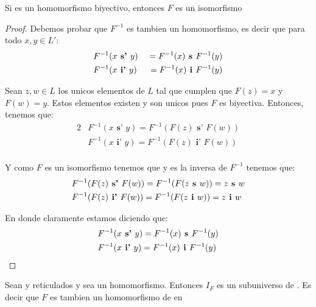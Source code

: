 \begin{lemma}
  Si  es un homomorfismo biyectivo,
  entonces $F$ es un isomorfismo
\end{lemma}
\begin{proof}
  Debemos probar que $F^{-1}$ es tambien un homomorfismo, es decir que para todo $x, y \in L'$:
  \begin{alignat*}{2}
    &F^{-1}(x \textbf{ s' }y) &\ = F^{-1}(x)\textbf{ s }F^{-1}(y)\\
    &F^{-1}(x \textbf{ i' }y) &\ = F^{-1}(x)\textbf{ i }F^{-1}(y)\\    
  \end{alignat*}

  Sean $z, w \in L$ los unicos elementos de $L$ tal que cumplen que $F(z) = x$ y $F(w) = y$. Estos elementos
  existen y son unicos pues $F$ es biyectiva. Entonces, tenemos que:
  \begin{alignat*}{2}
    &F^{-1}(x \textbf{ s' }y) = F^{-1}(F(z) \textbf{ s' }F(w))\\
    &F^{-1}(x \textbf{ i' }y) = F^{-1}(F(z) \textbf{ i' }F(w))\\    
  \end{alignat*}

  Y como $F$ es un isomorfismo tenemos que y es la inversa de $F^{-1}$ tenemos que:
  \begin{alignat*}{2}
    &F^{-1}(F(z) \textbf{ s' }F(w)) = F^{-1}(F(z\textbf{ s }w)) = z\textbf{ s }w\\
    &F^{-1}(F(z) \textbf{ i' }F(w)) = F^{-1}(F(z\textbf{ i }w)) = z\textbf{ i }w\\    
  \end{alignat*}

  En donde claramente estamos diciendo que:
  \begin{alignat*}{2}
    &F^{-1}(x \textbf{ s' } y) = F^{-1}(x)\textbf{ s }F^{-1}(y)\\
    &F^{-1}(x \textbf{ i' } y) = F^{-1}(x)\textbf{ i }F^{-1}(y)\\    
  \end{alignat*}
\end{proof}
\begin{lemma}
  Sean \reticulAlg y  reticulados y sea 
  un homomorfismo. Entonces $I_F$ es un subuniverso de . Es decir que $F$
  es tambien un homomorfismo de \reticulAlg en 
\end{lemma}
